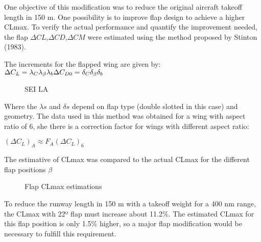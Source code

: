 ﻿One objective of this modification was to reduce the original aircraft takeoff length in 150 m. One possibility is to improve flap design to achieve a higher CLmax. To verify the actual performance and quantify the improvement needed, the flap $\Delta CL$,$\Delta CD$,$\Delta CM$ were estimated using the method proposed by Stinton (1983).

The increments for the flapped wing are given by:
                    $
                    \\\Delta C_{L}=\lambda_{C} \lambda_{\beta} \lambda_{b}
                    \\\Delta C_{D0}=\delta_{C} \delta_{\beta} \delta_{b}              
                    $



\begin{figure}[H] %
\caption{SEI LA}
\label{fig:flap-CmCl}
\end{figure}

Where the $\lambda s$ and $\delta s$ depend on flap type (double slotted in this case) and geometry.
The data used in this method was obtained for a wing with aspect ratio of 6, she there is a correction factor for wings with different aspect ratio:

                        $  (\Delta C_{L} )_{A} \approx F_{A} ( \Delta C_{L} )_{6}         $
                        
The estimative of CLmax was compared to the actual CLmax for the different flap positions $\beta$

\begin{figure}[H] %
\caption{Flap CLmax estimations}
\label{fig:FlapCLmaxestimations}
\end{figure}

To reduce the runway length in 150 m with a takeoff weight for a 400 nm range, the CLmax with 22º flap must increase about 11.2\%. The estimated CLmax for this flap position is only 1.5\% higher, so a major flap modification would be necessary to fulfill this requirement. 
